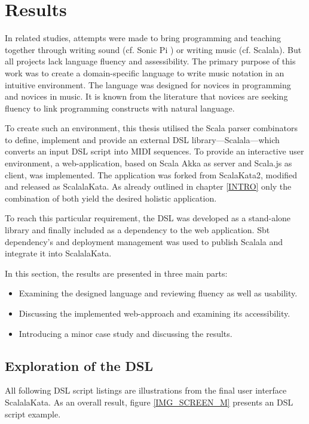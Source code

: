 \chapter{Results}
\label{RESULTS}
In related studies, attempts were made to bring programming and teaching together through writing sound (cf. Sonic Pi \cite{Aaron2016Art}) or writing music (cf. Scalala). But all projects lack language fluency and assessibility. The primary purpose of this work was to create a domain-specific language to write music notation in an intuitive environment. The language was designed for novices in programming and novices in music. It is known from the literature that novices are seeking fluency to link programming constructs with natural language.\cite{Bonar1985}

To create such an environment, this thesis utilised the Scala parser combinators to define, implement and provide an external DSL library—Scalala—which converts an input DSL script into MIDI sequences. To provide an interactive user environment, a web-application, based on Scala Akka as server and Scala.js as client, was implemented. The application was forked from ScalaKata2, modified and released as ScalalaKata. As already outlined in chapter \ref{INTRO} only the combination of both yield the desired holistic application.

To reach this particular requirement, the DSL was developed as a stand-alone library and finally included as a dependency to the web application. Sbt dependency's and deployment management was used to publish Scalala and integrate it into ScalalaKata.

In this section, the results are presented in three main parts:

\begin{itemize}
\item Examining the designed language and reviewing fluency as well as usability.
\item Discussing the implemented web-approach and examining its accessibility.
\item Introducing a minor case study and discussing the results.
\end{itemize}

\section{Exploration of the DSL}
\label{RESULTS_DSL}
All following DSL script listings are illustrations from the final user interface ScalalaKata. As an overall result, figure \ref{IMG_SCREEN_M} presents an DSL script example.

